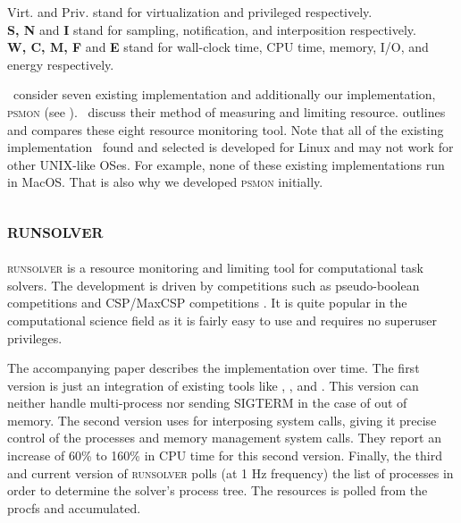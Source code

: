 \begin{table}
\begin{threeparttable}
\begin{tablenotes}
            \note Virt. and Priv. stand for virtualization and privileged respectively.\\
            \textbf{S, N} and \textbf{I} stand for sampling, notification, and interposition respectively.\\
            \textbf{W, C, M, F} and \textbf{E} stand for wall-clock time, CPU time, memory, I/O, and energy respectively.
        \end{tablenotes}
    \end{threeparttable}
\end{table}

\First~consider seven existing implementation and additionally our implementation, \textsc{psmon} (see ).
\First~discuss their method of measuring and limiting resource.
 outlines and compares these eight resource monitoring tool.
Note that all of the existing implementation \first~found and selected is developed for Linux and may not work for other UNIX-like OSes.
For example, none of these existing implementations run in MacOS.
That is also why we developed \textsc{psmon} initially.


\subsection{\textsc{runsolver}}
\label{sec:resource.impl.runsolver}

\textsc{runsolver} \citep{rousselControllingSolverExecution2011} is a resource monitoring and limiting tool for computational task solvers.
The development is driven by competitions such as pseudo-boolean competitions and CSP/MaxCSP competitions \citep{rousselControllingSolverExecution2011}.
It is quite popular in the computational science field as it is fairly easy to use and requires no superuser privileges.

The accompanying paper describes the implementation over time.
The first version is just an integration of existing tools like , , and .
This version can neither handle multi-process nor sending SIGTERM in the case of out of memory.
The second version uses  for interposing system calls, giving it precise control of the processes and memory management system calls.
They report an increase of 60\% to 160\% in CPU time for this second version.
Finally, the third and current version of \textsc{runsolver} polls (at 1 Hz frequency) the list of processes in order to determine the solver's process tree.
The resources is polled from the procfs and accumulated.

